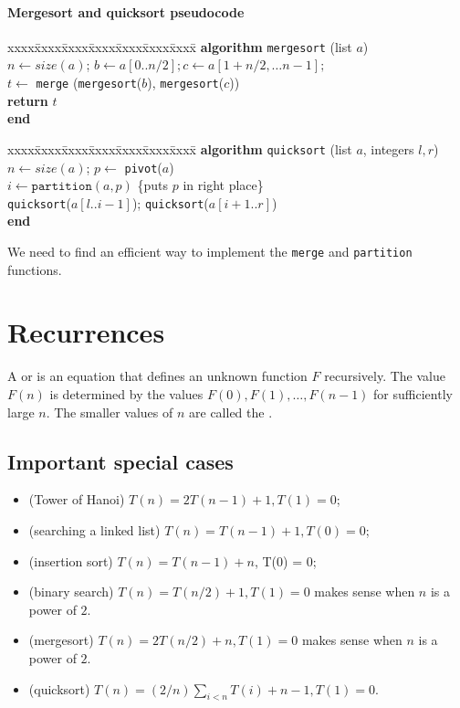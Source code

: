 \begin{frame}
\frametitle{Mergesort and quicksort pseudocode}
\begin{tabbing}
xxxx\=xxxx\=xxxx\=xxxx\=xxxx\=xxxx\=xxxx\= \kill
\textbf{algorithm} \texttt{mergesort} (list $a$) \\
$n \gets size(a)$; $b \gets a[0..n/2]; c \gets a[1+n/2, \dots n-1];$ \\
$t \gets $ \texttt{merge} (\texttt{mergesort}($b$), \texttt{mergesort}($c$)) \\
\textbf{return} $t$ \\
\textbf{end}
\end{tabbing}	
\begin{tabbing}
xxxx\=xxxx\=xxxx\=xxxx\=xxxx\=xxxx\=xxxx\= \kill
\textbf{algorithm} \texttt{quicksort} (list $a$, integers $l, r$) \\
$n \gets size(a)$; $p \gets$ \texttt{pivot}($a$)\\
$i \gets \texttt{partition}(a, p)$ \quad \{puts $p$ in right place\} \\
\texttt{quicksort}($a[l..i-1]$); \texttt{quicksort}($a[i+1..r]$)\\
\textbf{end}
\end{tabbing}

We need to find an efficient way to implement the \texttt{merge} and 
\texttt{partition} functions.
\end{frame}
\fi

\chapter{Recurrences} %
\begin{Definition}
A  or  is an
equation that defines an unknown function $F$ recursively. 
The value $F(n)$ is determined by the values $F(0), F(1), \dots, F(n-1)$ for
sufficiently large $n$. The smaller values of $n$ are called the
. 
\end{Definition}

\section{Important special cases}
\begin{itemize}
\item (Tower of Hanoi) $T(n) = 2 T(n - 1) + 1, T(1) = 0$;
\item (searching a linked list) $T(n) = T(n - 1) + 1, T(0) = 0$;
\item (insertion sort) $T(n) = T(n-1) + n$, T(0) = 0;
\item (binary search) $T(n) = T(n/2) + 1, T(1) = 0$ makes sense when $n$ is 
a power of $2$. 
\item (mergesort) $T(n) = 2T(n/2) + n, T(1) = 0$ makes sense when $n$ is 
a power of $2$.
\item (quicksort) $T(n) = (2/n)\sum_{i<n} T(i) + n-1, T(1) = 0$.
\end{itemize}


